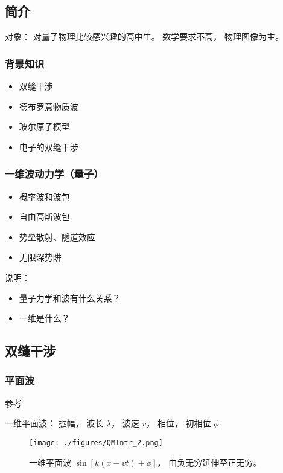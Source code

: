
\subsection{简介}
对象： 对量子物理比较感兴趣的高中生。 数学要求不高， 物理图像为主。

\subsubsection{背景知识}
\begin{itemize}
\item 双缝干涉
\item 德布罗意物质波
\item 玻尔原子模型
\item 电子的双缝干涉
\end{itemize}

\subsubsection{一维波动力学（量子）}
\begin{itemize}
\item 概率波和波包
\item 自由高斯波包
\item 势垒散射、隧道效应
\item 无限深势阱
\end{itemize}

说明：
\begin{itemize}
\item 量子力学和波有什么关系？
\item 一维是什么？
\end{itemize}

\subsection{双缝干涉}

\subsubsection{平面波}

参考

一维平面波： 振幅， 波长 $\lambda$， 波速 $v$， 相位， 初相位 $\phi$
\begin{figure}[ht]
\centering
\texttt{[image: ./figures/QMIntr\_2.png]}
\caption{一维平面波 $\sin[k(x-vt) + \phi]$， 由负无穷延伸至正无穷。} \label{QMIntr_fig2}
\end{figure}

